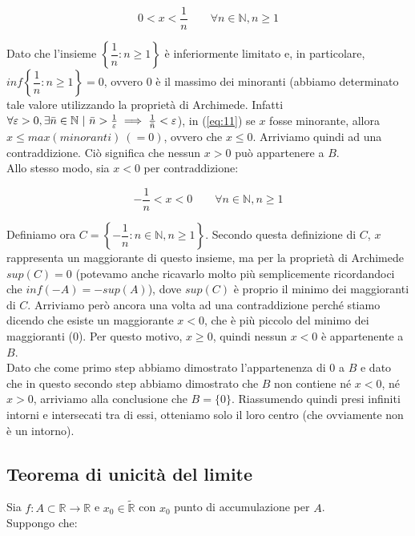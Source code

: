 \documentclass{article}
\begin{document}
\begin{equation}
    0 < x < \frac{1}{n} \qquad \forall n \in \mathbb{N}, n \geq 1
    \label{eq:11}
\end{equation}

\noindent Dato che l'insieme $\left\{\dfrac{1}{n} : n \geq 1\right\}$ è inferiormente limitato e, in particolare, $inf\left\{\dfrac{1}{n} : n \geq 1\right\} = 0$, ovvero $0$ è il massimo dei minoranti (abbiamo determinato tale valore utilizzando la proprietà di Archimede. Infatti $\forall \varepsilon > 0, \exists \Bar{n} \in \mathbb{N} \ | \ \Bar{n} > \frac{1}{\varepsilon} \implies \frac{1}{\Bar{n}} < \varepsilon$), in (\ref{eq:11}) se $x$ fosse minorante, allora $x \leq max(minoranti) \ (= 0)$, ovvero che $x \leq 0$. Arriviamo quindi ad una contraddizione. Ciò significa che nessun $x > 0$ può appartenere a $B$. \\
Allo stesso modo, sia $x < 0$ per contraddizione:

\begin{equation*}
    -\frac{1}{n} < x < 0 \qquad \forall n \in \mathbb{N}, n \geq 1
\end{equation*}

\noindent Definiamo ora $C = \left\{-\dfrac{1}{n} : n \in \mathbb{N}, n \geq 1\right\}$. Secondo questa definizione di $C$, $x$ rappresenta un maggiorante di questo insieme, ma per la proprietà di Archimede $sup(C) = 0$ (potevamo anche ricavarlo molto più semplicemente ricordandoci che $inf(-A) = -sup(A)$), dove $sup(C)$ è proprio il minimo dei maggioranti di $C$. Arriviamo però ancora una volta ad una contraddizione perché stiamo dicendo che esiste un maggiorante $x < 0$, che è più piccolo del minimo dei maggioranti ($0$). Per questo motivo, $x \geq 0$, quindi nessun $x < 0$ è appartenente a $B$.\\
Dato che come primo step abbiamo dimostrato l'appartenenza di $0$ a $B$ e dato che in questo secondo step abbiamo dimostrato che $B$ non contiene né $x < 0$, né $x > 0$, arriviamo alla conclusione che $B = \{0\}$. Riassumendo quindi presi infiniti intorni e intersecati tra di essi, otteniamo solo il loro centro (che ovviamente non è un intorno).


\subsection{Teorema di unicità del limite}
Sia $f: A \subset \mathbb{R} \xrightarrow{} \mathbb{R}$ e $x_0 \in \widetilde{\mathbb{R}}$ con $x_0$ punto di accumulazione per $A$.\\
Suppongo che:
\end{document}
